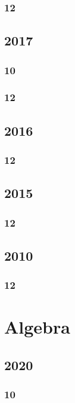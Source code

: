 \documentclass[11pt]{book}
\begin{document}
\subsection{12}




\section{2017}
\subsection{10}

\subsection{12}

\section{2016}
\subsection{12}



\section{2015}
\subsection{12}


\section{2010}
\subsection{12}



\chapter{Algebra}
\section{2020}
\subsection{10}

\end{document}
